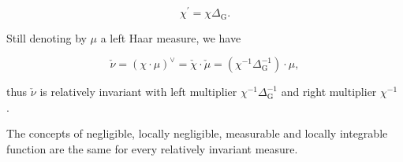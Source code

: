 \[
\chi^ {\prime} = \chi \Delta_ {\mathrm{G}}.\tag{35}
\]

Still denoting by \(\mu\) a left Haar measure, we have

\[
\check {\nu} = (\chi \cdot \mu) ^ {\vee} = \check {\chi} \cdot \check {\mu} = (\chi^ {- 1} \Delta_ {\mathrm{G}} ^ {- 1}) \cdot \mu ,
\]

thus \(\check{\nu}\) is relatively invariant with left multiplier \(\chi^{-1}\Delta_{\mathrm{G}}^{-1}\) and right multiplier \(\chi^{-1}\) .

The concepts of negligible, locally negligible, measurable and locally integrable function are the same for every relatively invariant measure.


